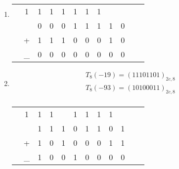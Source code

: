 \documentclass{article}
\begin{document}
\begin{enumerate}
\begin{enumerate}
\begin{enumerate}
			            \item \begin{tabular}{cccccccccccc}
				                   & 1  & 1 & 1 & 1 & 1 & 1 & 1 &   &   \\
				                   &    & 0 & 0 & 0 & 1 & 1 & 1 & 1 & 0 \\
				                   & +  & 1 & 1 & 1 & 0 & 0 & 0 & 1 & 0 \\
				                  \hline
				                   & \_ & 0 & 0 & 0 & 0 & 0 & 0 & 0 & 0 \\
			                  \end{tabular}


			            \item
			                  \begin{align*}
				                  T_8(-19) = ( 11101101 )_{2c,8} \\
				                  T_8(-93) = ( 10100011 )_{2c,8} \\
			                  \end{align*}
			                  \begin{tabular}{cccccccccccc}
				                   & 1  & 1 & 1 &   & 1 & 1 & 1 & 1 &   \\
				                   &    & 1 & 1 & 1 & 0 & 1 & 1 & 0 & 1 \\
				                   & +  & 1 & 0 & 1 & 0 & 0 & 0 & 1 & 1 \\
				                  \hline
				                   & \_ & 1 & 0 & 0 & 1 & 0 & 0 & 0 & 0 \\
			                  \end{tabular}

			                   \\


\end{enumerate}
\end{enumerate}
\end{enumerate}
\end{document}
